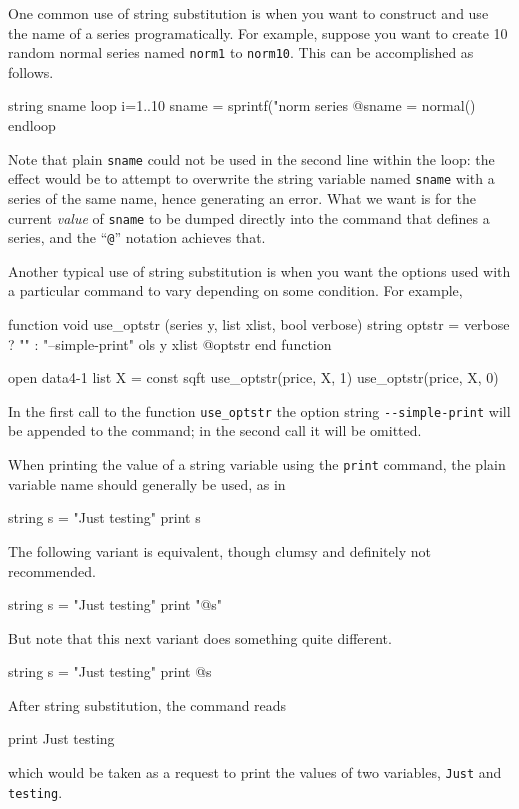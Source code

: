 One common use of string substitution is when you want to construct
and use the name of a series programatically. For example, suppose you
want to create 10 random normal series named \texttt{norm1} to
\texttt{norm10}. This can be accomplished as follows.
%
\begin{code}
string sname
loop i=1..10
  sname = sprintf("norm%
  series @sname = normal()
endloop
\end{code}
%
Note that plain \texttt{sname} could not be used in the second line
within the loop: the effect would be to attempt to overwrite the
string variable named \texttt{sname} with a series of the same name,
hence generating an error. What we want is for the current
\textit{value} of \texttt{sname} to be dumped directly into the
command that defines a series, and the ``\verb|@|'' notation achieves
that.

Another typical use of string substitution is when you want the
options used with a particular command to vary depending on
some condition. For example,
%
\begin{code}
function void use_optstr (series y, list xlist, bool verbose)
   string optstr = verbose ? "" : "--simple-print"
   ols y xlist @optstr 
end function

open data4-1
list X = const sqft
use_optstr(price, X, 1)
use_optstr(price, X, 0)
\end{code}

In the first call to the function \texttt{use\_optstr} the option
string \verb|--simple-print| will be appended to the 
command; in the second call it will be omitted.

When printing the value of a string variable using the \texttt{print}
command, the plain variable name should generally be used, as in
%
\begin{code}
string s = "Just testing"
print s
\end{code}
%
The following variant is equivalent, though clumsy and definitely not
recommended.
%
\begin{code}
string s = "Just testing"
print "@s"
\end{code}
%
But note that this next variant does something quite different.
%
\begin{code}
string s = "Just testing"
print @s
\end{code}
%
After string substitution, the command reads
%
\begin{code}
print Just testing
\end{code}
%
which would be taken as a request to print the values of two
variables, \texttt{Just} and \texttt{testing}.

